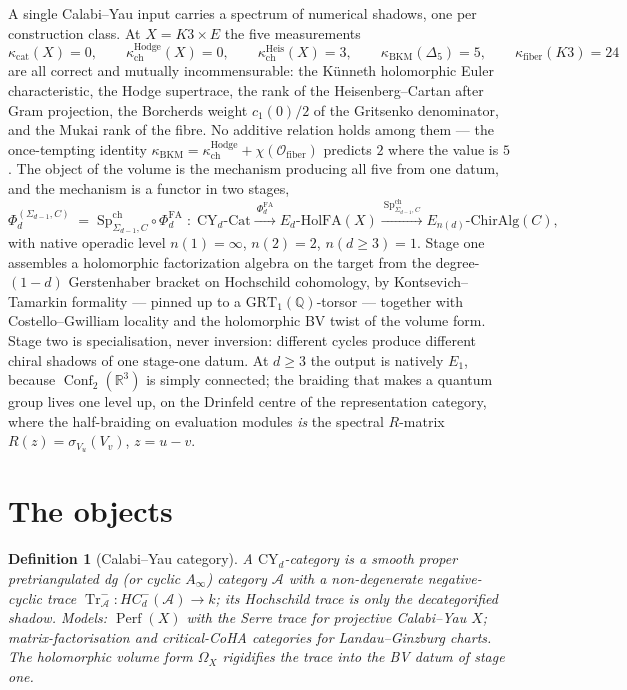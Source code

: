 \documentclass[11pt]{article}
\providecommand{\cA}{\mathcal{A}}
\providecommand{\cO}{\mathcal{O}}
\providecommand{\bR}{\mathbb{R}}
\providecommand{\bQ}{\mathbb{Q}}
\providecommand{\kch}{\kappa_{\mathrm{ch}}}
\providecommand{\kBKM}{\kappa_{\mathrm{BKM}}}
\providecommand{\kcat}{\kappa_{\mathrm{cat}}}
\providecommand{\kfib}{\kappa_{\mathrm{fiber}}}
\providecommand{\PhiFA}{\Phi^{\mathrm{FA}}}
\providecommand{\SpCh}{\mathrm{Sp}^{\mathrm{ch}}}
\providecommand{\Dfive}{\Delta_5}
\providecommand{\Tr}{\operatorname{Tr}}
\providecommand{\Conf}{\operatorname{Conf}}
\providecommand{\Perf}{\operatorname{Perf}}
\newtheorem{definition}[theorem]{Definition}
\begin{document}
A single Calabi--Yau input carries a spectrum of numerical shadows,
one per construction class. At $X=K3\times E$ the five measurements
\[
\kcat(X)=0,\qquad
\kch^{\mathrm{Hodge}}(X)=0,\qquad
\kch^{\mathrm{Heis}}(X)=3,\qquad
\kBKM(\Dfive)=5,\qquad
\kfib(K3)=24
\]
are all correct and mutually incommensurable: the K\"unneth
holomorphic Euler characteristic, the Hodge supertrace, the rank of
the Heisenberg--Cartan after Gram projection, the Borcherds weight
$c_1(0)/2$ of the Gritsenko denominator, and the Mukai rank of the
fibre. No additive relation holds among them --- the once-tempting
identity $\kBKM=\kch^{\mathrm{Hodge}}+\chi(\cO_{\mathrm{fiber}})$
predicts $2$ where the value is $5$. The object of the volume is the
mechanism producing all five from one datum, and the mechanism is a
functor in two stages,
\[
\Phi_d^{(\Sigma_{d-1},C)}
\;=\;
\SpCh_{\Sigma_{d-1},C}\circ\PhiFA_d
\;:\;
\mathrm{CY}_d\text{-}\mathrm{Cat}
\xrightarrow{\ \PhiFA_d\ }
E_d\text{-}\mathrm{HolFA}(X)
\xrightarrow{\ \SpCh_{\Sigma_{d-1},C}\ }
E_{n(d)}\text{-}\mathrm{ChirAlg}(C),
\]
with native operadic level $n(1)=\infty$, $n(2)=2$, $n(d\ge3)=1$.
Stage one assembles a holomorphic factorization algebra on the target
from the degree-$(1-d)$ Gerstenhaber bracket on Hochschild cohomology,
by Kontsevich--Tamarkin formality --- pinned up to a
$\mathrm{GRT}_1(\bQ)$-torsor --- together with Costello--Gwilliam
locality and the holomorphic BV twist of the volume form. Stage two is
specialisation, never inversion: different cycles produce different
chiral shadows of one stage-one datum. At $d\ge3$ the output is
natively $E_1$, because $\Conf_2(\bR^3)$ is simply connected; the
braiding that makes a quantum group lives one level up, on the
Drinfeld centre of the representation category, where the half-braiding
on evaluation modules \emph{is} the spectral $R$-matrix
$R(z)=\sigma_{V_u}(V_v)$, $z=u-v$.

\section{The objects}\label{sec:objects}

\begin{definition}[Calabi--Yau category]
A $\mathrm{CY}_d$-category is a smooth proper pretriangulated dg (or
cyclic $A_\infty$) category $\cA$ with a non-degenerate negative-cyclic
trace $\Tr^-_\cA\colon HC^-_d(\cA)\to k$; its Hochschild trace is only
the decategorified shadow. Models: $\Perf(X)$ with the Serre trace for
projective Calabi--Yau $X$; matrix-factorisation and critical-CoHA
categories for Landau--Ginzburg charts. The holomorphic volume form
$\Omega_X$ rigidifies the trace into the BV datum of stage one.
\end{definition}
\end{document}
